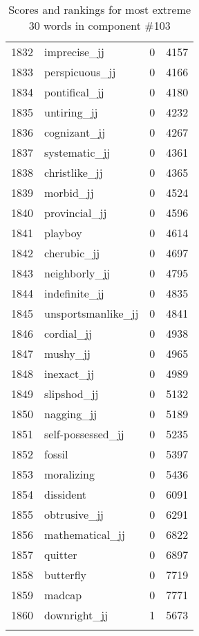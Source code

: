 \begin{longtable}[!htbp]{| rlr@{.}l |}
    1832 & imprecise\_jj & 0 & 4157 \\
    1833 & perspicuous\_jj & 0 & 4166 \\
    1834 & pontifical\_jj & 0 & 4180 \\
    1835 & untiring\_jj & 0 & 4232 \\
    1836 & cognizant\_jj & 0 & 4267 \\
    1837 & systematic\_jj & 0 & 4361 \\
    1838 & christlike\_jj & 0 & 4365 \\
    1839 & morbid\_jj & 0 & 4524 \\
    1840 & provincial\_jj & 0 & 4596 \\
    1841 & playboy & 0 & 4614 \\
    1842 & cherubic\_jj & 0 & 4697 \\
    1843 & neighborly\_jj & 0 & 4795 \\
    1844 & indefinite\_jj & 0 & 4835 \\
    1845 & unsportsmanlike\_jj & 0 & 4841 \\
    1846 & cordial\_jj & 0 & 4938 \\
    1847 & mushy\_jj & 0 & 4965 \\
    1848 & inexact\_jj & 0 & 4989 \\
    1849 & slipshod\_jj & 0 & 5132 \\
    1850 & nagging\_jj & 0 & 5189 \\
    1851 & self-possessed\_jj & 0 & 5235 \\
    1852 & fossil & 0 & 5397 \\
    1853 & moralizing & 0 & 5436 \\
    1854 & dissident & 0 & 6091 \\
    1855 & obtrusive\_jj & 0 & 6291 \\
    1856 & mathematical\_jj & 0 & 6822 \\
    1857 & quitter & 0 & 6897 \\
    1858 & butterfly & 0 & 7719 \\
    1859 & madcap & 0 & 7771 \\
    1860 & downright\_jj & 1 & 5673 \\
    \hline
    \caption{Scores and rankings for most extreme 30 words in component \#103} \\
\end{longtable}
